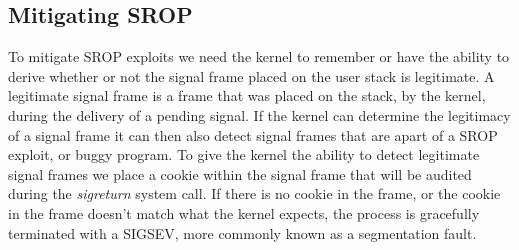 \documentclass{sig-alternate-05-2015}
\begin{document}
\subsection{Mitigating SROP}
To mitigate SROP exploits we need the kernel to remember or have the ability to derive whether or not the signal frame placed on the user stack is legitimate. A legitimate signal frame is a frame that was placed on the stack, by the kernel, during the delivery of a pending signal. If the kernel can determine the legitimacy of a signal frame it can then also detect signal frames that are apart of a SROP exploit, or buggy program. To give the kernel the ability to detect legitimate signal frames we place a cookie within the signal frame that will be audited during the \textit{sigreturn} system call. If there is no cookie in the frame, or the cookie in the frame doesn't match what the kernel expects, the process is gracefully terminated with a SIGSEV, more commonly known as a segmentation fault. 
\end{document}
